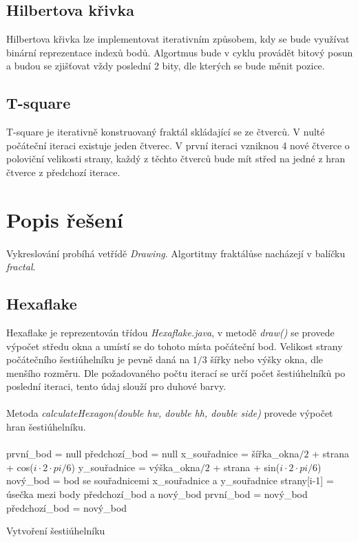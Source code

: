 \documentclass[12pt]{scrartcl}
\begin{document}
\subsection{Hilbertova křivka}
Hilbertova křivka lze implementovat iterativním způsobem, kdy se bude využívat binární reprezentace indexů bodů. Algortmus bude v cyklu provádět bitový posun a budou se zjišťovat vždy poslední 2 bity, dle kterých se bude měnit pozice.

\subsection{T-square}
T-square je iterativně konstruovaný fraktál skládající se ze čtverců. V nulté počáteční iteraci existuje jeden čtverec. V první iteraci vzniknou 4 nové čtverce o poloviční velikosti strany, každý z těchto čtverců bude mít střed na jedné z hran čtverce z předchozí iterace.

\section{Popis řešení}

\paragraph{}
Vykreslování probíhá ve\nobreakspace třídě \emph{Drawing}. Algortitmy fraktálů\nobreakspace se nacházejí v balíčku \emph{fractal}.

\subsection{Hexaflake}
Hexaflake je reprezentován třídou \emph{Hexaflake.java}, v metodě \emph{draw()} se provede výpočet středu okna a umístí se do tohoto místa počáteční bod. Velikost strany počátečního šestiúhelníku je pevně daná na $1/3$ šířky nebo výšky okna, dle menšího rozměru. Dle požadovaného počtu iterací se určí počet šestiúhelníků po poslední iteraci, tento údaj slouží pro duhové barvy.
\paragraph{}
Metoda \emph{calculateHexagon(double hw, double hh, double side)} provede výpočet hran šestiúhelníku.
\paragraph{}
\begin{algorithm}[H]
	první\_bod = null\;
	předchozí\_bod = null\;
	 {
		x\_souřadnice = šířka\_okna$/2$ + strana + cos($i \cdot 2 \cdot pi / 6$)\;
		y\_souřadnice = výška\_okna$/2$ + strana + sin($i \cdot 2 \cdot pi / 6$)\;
		 {
			nový\_bod = bod se souřadnicemi x\_souřadnice a y\_souřadnice\;
			strany[i-1] = úsečka mezi body předchozí\_bod a nový\_bod\;
		} {
			první\_bod = nový\_bod\;
		}
		předchozí\_bod = nový\_bod\;
	}
	\caption{Vytvoření šestiúhelníku}
\end{algorithm}
\end{document}
